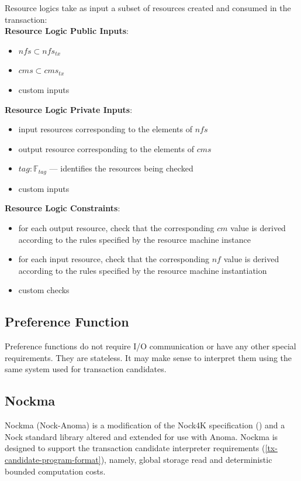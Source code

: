 \documentclass[
    11pt,            %
    techreport,        %
    affiltop,       %
]{art}
\begin{document}
Resource logics take as input a subset of resources created and consumed in the transaction:\\

\textbf{Resource Logic Public Inputs}: 

\begin{itemize}
    \item $nfs \subset nfs_{tx}$
    \item $cms \subset cms_{tx}$
    \item custom inputs
\end{itemize}

\textbf{Resource Logic Private Inputs}:
\begin{itemize}
    \item input resources corresponding to the elements of $nfs$
    \item output resource corresponding to the elements of $cms$
    \item $tag: \mathbb{F}_{tag}$ —  identifies the resources being checked
    \item custom inputs
\end{itemize}

\textbf{Resource Logic Constraints}:
\begin{itemize}
    \item for each output resource, check that the corresponding $cm$ value is derived according to the rules specified by the resource machine instance
    \item for each input resource, check that the corresponding $nf$ value is derived according to the rules specified by the resource machine instantiation
    \item custom checks
\end{itemize}

\subsection{Preference Function} %
 Preference functions do not require I/O communication or have any other special requirements. They are stateless. It may make sense to interpret them using the same system used for transaction candidates.

\subsection{Nockma}
Nockma (Nock-Anoma) is a modification of the Nock4K specification (\cite{nock4k}) and a Nock standard library altered and extended for use with Anoma. Nockma is designed to support the transaction candidate interpreter requirements (\ref{tx-candidate-program-format}), namely, global storage read and deterministic bounded computation costs.
\end{document}
